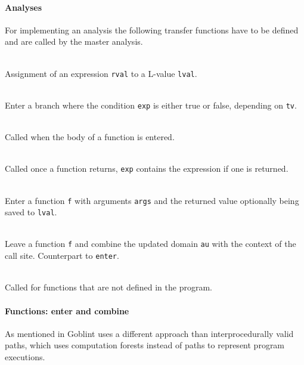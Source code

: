 \paragraph*{Analyses}
For implementing an analysis the following transfer functions have to be defined and are called by the master analysis.
\begin{description}
\item {}\\
Assignment of an expression \verb|rval| to a L-value \verb|lval|.

\item {}\\
Enter a branch where the condition \verb|exp| is either true or false, depending on \verb|tv|.

\item {}\\
Called when the body of a function is entered.

\item {}\\
Called once a function returns, \verb|exp| contains the expression if one is returned.

\item {}\\
Enter a function \verb|f| with arguments \verb|args| and the returned value optionally being saved to \verb|lval|.

\item {}\\
Leave a function \verb|f| and combine the updated domain \verb|au| with the context of the call site. Counterpart to \verb|enter|.

\item {}\\
Called for functions that are not defined in the program.
\end{description}

\paragraph*{Functions: enter and combine}
As mentioned in  Goblint uses a different approach than interprocedurally valid paths, which uses computation forests instead of paths to represent program executions.

